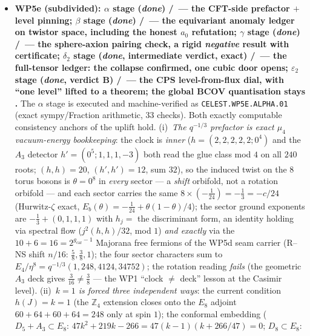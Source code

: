 \documentclass[11pt,a4paper]{article}
\newcommand{\gcar}{g_{\mathrm{car}}}
\newcommand{\Z}{\mathbb Z}
\begin{document}
\begin{itemize}
\begin{itemize}
rational (hence split $+$ strongly additive)'' is \emph{Xu's theorem} (algebraic orbifold CFTs) ---
cited, \emph{not} claimed; the continuum proof for the concrete seam quotient net on the collar
(\vref{v336}/\vref{v449}) and for the interacting condensed $(E_8)_1$ net remains WP5e /
Costello--Li territory.
\item \textbf{WP5e (subdivided): $\alpha$ stage (\emph{done}) \mE/\mC\ --- the CFT-side prefactor
$+$ level pinning; $\beta$ stage (\emph{done}) \mE/\mC\ --- the equivariant anomaly ledger on
twistor space, including the honest $a_0$ refutation; $\gamma$ stage (\emph{done}) \mE/\mC\ ---
the sphere-axion pairing check, a rigid \emph{negative} result with certificate; $\delta_2$ stage
(\emph{done}, intermediate verdict, exact) \mE/\mC\ --- the full-tensor ledger: the collapse
confirmed, one cubic door opens; $\varepsilon_2$
stage (\emph{done}, verdict B) \mE/\mC\ --- the CPS level-from-flux dial, with ``one level''
lifted to a theorem; the global BCOV quantisation stays \mO.}
The $\alpha$ stage is executed and
machine-verified as \texttt{CELEST.WP5E.ALPHA.01} 
(exact sympy/Fraction arithmetic, $33$ checks). Both exactly computable consistency anchors of the
uplift hold. (i)~\emph{The $q^{-1/3}$ prefactor is exact $\mu_4$ vacuum-energy bookkeeping}: the
clock is \emph{inner} ($h=(2,2,2,2,2;0^4)$ and the $A_3$ detector $h'=(0^5;1,1,1,-3)$ both read the
glue class mod $4$ on all $240$ roots; $(h,h)=20$, $(h',h')=12$, sum $32$), so the induced twist on
the $8$ torus bosons is $\theta=0^8$ in \emph{every} sector --- a \emph{shift} orbifold, not a
rotation orbifold --- and each sector carries the same $8\times(-\tfrac1{24})=-\tfrac13=-c/24$
(Hurwitz-$\zeta$ exact, $E_b(\theta)=-\tfrac1{24}+\theta(1-\theta)/4$); the sector ground exponents
are $-\tfrac13+(0,1,1,1)$ with $h_j=$ the discriminant form, an identity holding via spectral flow
($j^2(h,h)/32$, mod $1$) \emph{and exactly} via the $10+6=16=2^{\gcar-1}$ Majorana free fermions of
the WP5d seam carrier (R--NS shift $n/16$: $\tfrac58,\tfrac38,1$); the four sector characters sum to
$E_4/\eta^8=q^{-1/3}(1,248,4124,34752)$; the rotation reading \emph{fails} (the geometric $A_3$ deck
gives $\tfrac3{16}\neq\tfrac38$ --- the WP1 ``clock $\neq$ deck'' lesson at the Casimir level).
(ii)~\emph{$k=1$ is forced three independent ways}: the current condition $h(J)=k=1$ (the $\Z_4$
extension closes onto the $E_8$ adjoint $60{+}64{+}60{+}64=248$ only at spin $1$); the conformal
embedding ($D_5{+}A_3\subset E_8$: $47k^2{+}219k{-}266=47(k{-}1)(k{+}266/47)=0$; $D_8\subset E_8$:

\end{itemize}
\end{itemize}
\end{document}
